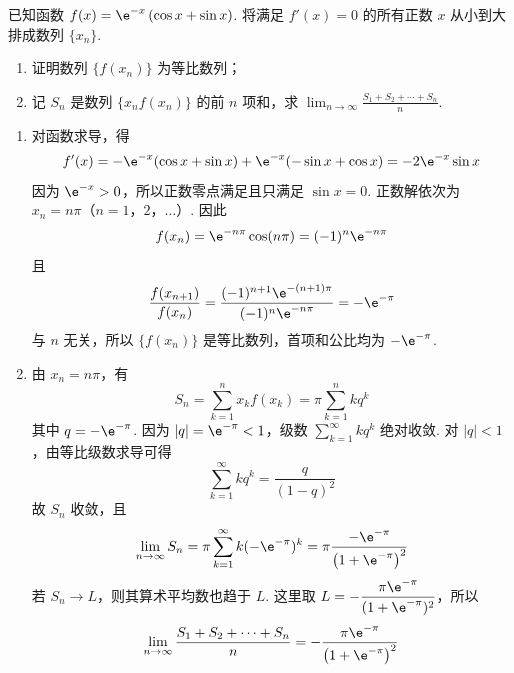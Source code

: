 \begin{problem}
已知函数 \(f(x) = \e^{-x}\left(\cos x + \sin x\right)\). 将满足 \(f'(x) = 0\) 的所有正数 \(x\) 从小到大排成数列 \(\{x_n\}\).

\begin{enumerate}
\item 证明数列 \(\{f(x_n)\}\) 为等比数列；
\item 记 \(S_{n}\) 是数列 \(\{x_n f(x_n)\}\) 的前 \(n\) 项和，求 \(\displaystyle\lim_{n\to \infty}\frac{S_1 + S_2 + \cdots + S_n}{n}\).
\end{enumerate}
\end{problem}

\begin{solution}
\begin{enumerate}
\item 对函数求导，得
\[
f'(x)=-\e^{-x}(\cos x+\sin x)+\e^{-x}(-\sin x+\cos x)=-2\e^{-x}\sin x
\]
因为 \(\e^{-x}>0\)，所以正数零点满足且只满足 \(\sin x=0\). 正数解依次为 \(x_n=n\pi\)（\(n=1\)，\(2\)，\(\ldots\)）. 因此
\[
f(x_n)=\e^{-n\pi}\cos(n\pi)=(-1)^n\e^{-n\pi}
\]
且
\[
\frac{f(x_{n+1})}{f(x_n)}=\frac{(-1)^{n+1}\e^{-(n+1)\pi}}{(-1)^n\e^{-n\pi}}=-\e^{-\pi}
\]
与 \(n\) 无关，所以 \(\{f(x_n)\}\) 是等比数列，首项和公比均为 \(-\e^{-\pi}\).

\item 由 \(x_n=n\pi\)，有
\[
S_n=\sum_{k=1}^{n}x_kf(x_k)=\pi\sum_{k=1}^{n}kq^k
\]
其中 \(q=-\e^{-\pi}\).
因为 \(|q|=\e^{-\pi}<1\)，级数 \(\sum_{k=1}^{\infty}kq^k\) 绝对收敛. 对 \(|q|<1\)，由等比级数求导可得
\[
\sum_{k=1}^{\infty}kq^k=\frac{q}{(1-q)^2}
\]
故 \(S_n\) 收敛，且
\[
\lim_{n\to\infty}S_n
=\pi\sum_{k=1}^{\infty}k(-\e^{-\pi})^k
=\pi\frac{-\e^{-\pi}}{\left(1+\e^{-\pi}\right)^2}
\]
若 \(S_n\to L\)，则其算术平均数也趋于 \(L\). 这里取 \(L=-\dfrac{\pi\e^{-\pi}}{(1+\e^{-\pi})^2}\)，所以
\[
\lim_{n\to\infty}\frac{S_1+S_2+\cdots+S_n}{n}
=-\frac{\pi\e^{-\pi}}{\left(1+\e^{-\pi}\right)^2}
\]
\end{enumerate}
\end{solution}
